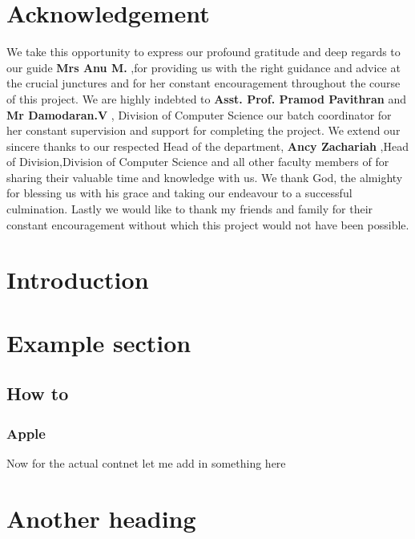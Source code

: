 \documentclass{article}
\begin{document}
\vspace*{\fill}

\newpage

\vspace*{\fill}

\section{Acknowledgement}

\Large
We take this opportunity to express our profound gratitude and deep regards to our guide \textbf{Mrs Anu M.}
,for providing us with the right guidance and advice at the crucial junctures and for her constant encouragement throughout the course of this project. We are highly indebted to \textbf{Asst. Prof. Pramod Pavithran}
 and \textbf{Mr Damodaran.V}
 , Division of Computer Science our batch coordinator for her constant supervision and support for completing the project. We extend our sincere thanks to our respected Head of the department, \textbf{Ancy Zachariah}
 ,Head of Division,Division of Computer Science and all other faculty members of for sharing their valuable time and knowledge with us. We thank God, the almighty for blessing us with his grace and taking our endeavour to a successful culmination. Lastly we would like to thank my friends and family for their constant encouragement without which this project would not have been possible.

\vspace*{\fill}

\newpage

\section{Introduction}
\section{Example section}
\subsection{How to}
\subsubsection{Apple}

Now for the actual contnet let me add in something here

\section{Another heading}
\end{document}
